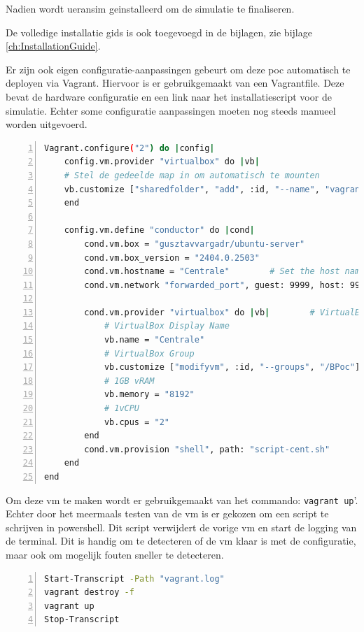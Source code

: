 Nadien wordt \gls{ueransim} geinstalleerd om de simulatie te finaliseren. 

De volledige installatie gids is ook toegevoegd in de bijlagen, zie bijlage \ref{ch:InstallationGuide}.

Er zijn ook eigen configuratie-aanpassingen gebeurt om deze \gls{poc} automatisch te deployen via Vagrant. Hiervoor is er gebruikgemaakt van een Vagrantfile. Deze bevat de hardware configuratie en een link naar het installatiescript voor de simulatie. Echter some configuratie aanpassingen moeten nog steeds manueel worden uitgevoerd.

\begin{lstlisting}[basicstyle=\small, frame=single, breaklines=true, postbreak=\mbox{\textcolor{red}{$\hookrightarrow$}\space}, escapeinside ={\%,}, escapechar={!}, numbers=left, language=sh, caption=Vagrantfile]
Vagrant.configure("2") do |config|
    config.vm.provider "virtualbox" do |vb|
    # Stel de gedeelde map in om automatisch te mounten
    vb.customize ["sharedfolder", "add", :id, "--name", "vagrant_data", "--hostpath", ".", "--automount"]
    end

    config.vm.define "conductor" do |cond|
        cond.vm.box = "gusztavvargadr/ubuntu-server"
        cond.vm.box_version = "2404.0.2503"
        cond.vm.hostname = "Centrale"        # Set the host name of the VM
        cond.vm.network "forwarded_port", guest: 9999, host: 9999, host_ip: "127.0.0.1", id: "open5gs"        # Set portforwarding

        cond.vm.provider "virtualbox" do |vb|        # VirtualBox specific configuration
            # VirtualBox Display Name
            vb.name = "Centrale"
            # VirtualBox Group
            vb.customize ["modifyvm", :id, "--groups", "/BPoc"]
            # 1GB vRAM
            vb.memory = "8192"
            # 1vCPU
            vb.cpus = "2"
        end
        cond.vm.provision "shell", path: "script-cent.sh"
    end
end
\end{lstlisting}

Om deze \gls{vm} te maken wordt er gebruikgemaakt van het commando: \verb|vagrant up|'. Echter door het meermaals testen van de \gls{vm} is er gekozen om een script te schrijven in powershell. Dit script verwijdert de vorige \gls{vm} en start de logging van de terminal. Dit is handig om te detecteren of de \gls{vm} klaar is met de configuratie, maar ook om mogelijk fouten sneller te detecteren.

\begin{lstlisting}[basicstyle=\small, frame=single, breaklines=true, postbreak=\mbox{\textcolor{red}{$\hookrightarrow$}\space}, escapeinside ={\%,}, escapechar={!}, numbers=left, language=sh, caption=Build Script]
Start-Transcript -Path "vagrant.log"
vagrant destroy -f
vagrant up
Stop-Transcript
\end{lstlisting}

